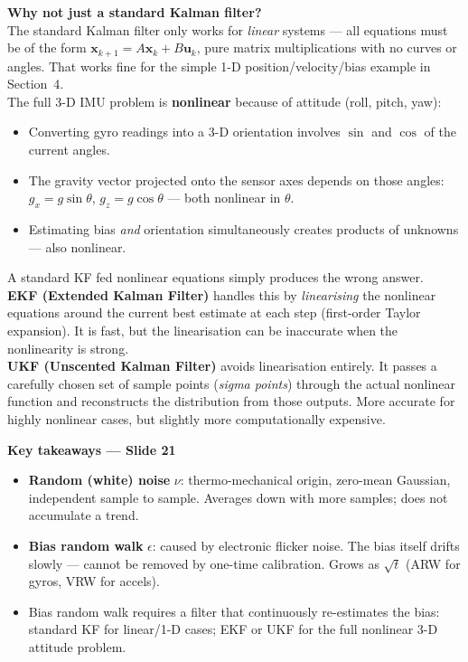 \documentclass[12pt, a4paper]{article}
\begin{document}
\begin{warnbox}
  \textbf{Why not just a standard Kalman filter?}\\
  The standard Kalman filter only works for \emph{linear} systems ---
  all equations must be of the form
  $\mathbf{x}_{k+1} = A\mathbf{x}_k + B\mathbf{u}_k$,
  pure matrix multiplications with no curves or angles.
  That works fine for the simple 1-D position/velocity/bias example
  in Section~4.\\[4pt]
  The full 3-D IMU problem is \textbf{nonlinear} because of attitude
  (roll, pitch, yaw):
  \begin{itemize}[leftmargin=1.4em, topsep=2pt]
    \item Converting gyro readings into a 3-D orientation involves
          $\sin$ and $\cos$ of the current angles.
    \item The gravity vector projected onto the sensor axes depends
          on those angles:
          $g_x = g\sin\theta$,\; $g_z = g\cos\theta$ ---
          both nonlinear in $\theta$.
    \item Estimating bias \emph{and} orientation simultaneously
          creates products of unknowns --- also nonlinear.
  \end{itemize}
  A standard KF fed nonlinear equations simply produces the wrong
  answer.\\[4pt]
  \textbf{EKF (Extended Kalman Filter)} handles this by
  \emph{linearising} the nonlinear equations around the current best
  estimate at each step (first-order Taylor expansion).
  It is fast, but the linearisation can be inaccurate when the
  nonlinearity is strong.\\[4pt]
  \textbf{UKF (Unscented Kalman Filter)} avoids linearisation entirely.
  It passes a carefully chosen set of sample points
  (\emph{sigma points}) through the actual nonlinear function and
  reconstructs the distribution from those outputs.
  More accurate for highly nonlinear cases, but slightly more
  computationally expensive.
\end{warnbox}

\begin{keybox}
  \textbf{Key takeaways --- Slide 21}
  \begin{itemize}[leftmargin=1.4em, topsep=2pt]
    \item \textbf{Random (white) noise} $\nu$: thermo-mechanical
          origin, zero-mean Gaussian, independent sample to sample.
          Averages down with more samples; does not accumulate a trend.
    \item \textbf{Bias random walk} $\epsilon$: caused by electronic
          flicker noise.
          The bias itself drifts slowly --- cannot be removed by
          one-time calibration.
          Grows as $\sqrt{t}$ (ARW for gyros, VRW for accels).
    \item Bias random walk requires a filter that continuously
          re-estimates the bias: standard KF for linear/1-D cases;
          EKF or UKF for the full nonlinear 3-D attitude problem.
  \end{itemize}
\end{keybox}
\end{document}
